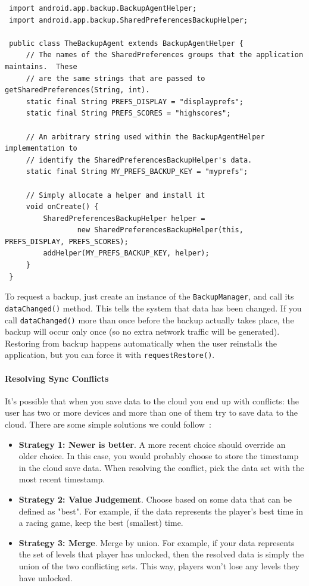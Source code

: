 \begin{verbatim}
 import android.app.backup.BackupAgentHelper;
 import android.app.backup.SharedPreferencesBackupHelper;

 public class TheBackupAgent extends BackupAgentHelper {
     // The names of the SharedPreferences groups that the application maintains.  These
     // are the same strings that are passed to getSharedPreferences(String, int).
     static final String PREFS_DISPLAY = "displayprefs";
     static final String PREFS_SCORES = "highscores";

     // An arbitrary string used within the BackupAgentHelper implementation to
     // identify the SharedPreferencesBackupHelper's data.
     static final String MY_PREFS_BACKUP_KEY = "myprefs";

     // Simply allocate a helper and install it
     void onCreate() {
         SharedPreferencesBackupHelper helper =
                 new SharedPreferencesBackupHelper(this, PREFS_DISPLAY, PREFS_SCORES);
         addHelper(MY_PREFS_BACKUP_KEY, helper);
     }
 }
\end{verbatim}

To request a backup, just create an instance of the \texttt{BackupManager}, and call its \texttt{dataChanged()} method. This tells the system that data has been changed. If you call \texttt{dataChanged()} more than once before the backup actually takes place, the backup will occur only once (so no extra network traffic will be generated). Restoring from backup happens automatically when the user reinstalls the application, but you can force it with \texttt{requestRestore()}. 

\paragraph{Resolving Sync Conflicts}
It's possible that when you save data to the cloud you end up with conflicts: the user has two or more devices and more than one of them try to save data to the cloud. There are some simple solutions we could follow~\cite{android:cloudsync2}:

\begin{itemize}
\item \textbf{Strategy 1: Newer is better}. A more recent choice should override an older choice. In this case, you would probably choose to store the timestamp in the cloud save data. When resolving the conflict, pick the data set with the most recent timestamp.
\item \textbf{Strategy 2: Value Judgement}. Choose based on some data that can be defined as "best". For example, if the data represents the player's best time in a racing game, keep the best (smallest) time.
\item \textbf{Strategy 3: Merge}. Merge by union. For example, if your data represents the set of levels that player has unlocked, then the resolved data is simply the union of the two conflicting sets. This way, players won't lose any levels they have unlocked.
\end{itemize}

